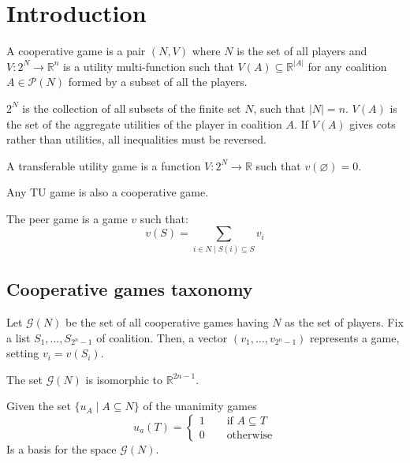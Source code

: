 \section{Introduction}

\begin{definition}
    A cooperative game is a pair $(N,V)$ where $N$ is the set of all players and $V:2^N\rightarrow\mathbb{R}^n$ is a utility multi-function such that $V(A)\subseteq\mathbb{R}^{\left\lvert A\right\rvert}$ for any coalition $A\in\mathcal{P}(N)$ formed by a subset of all the players.
\end{definition}
\noindent $2^N$ is the collection of all subsets of the finite set $N$, such that $\left\lvert N\right\rvert=n$. 
$V(A)$ is the set of the aggregate utilities of the player in coalition $A$. 
If $V(A)$ gives cots rather than utilities, all inequalities must be reversed. 

\begin{definition}
    A transferable utility game is a function $V:2^N\rightarrow\mathbb{R}$ such that $v(\varnothing)=0$.
\end{definition}
\noindent Any TU game is also a cooperative game. 

\begin{definition}
    The peer game is a game $v$ such that: 
    \[v(S)=\sum_{i\in N\mid S(i)\subseteq S}v_i\]
\end{definition}

\subsection{Cooperative games taxonomy}
Let $\mathcal{G}(N)$ be the set of all cooperative games having $N$ as the set of players. 
Fix a list $S_1,\dots,S_{2^n-1}$ of coalition. 
Then, a vector $(v_1,\dots,v_{2^n-1})$ represents a game, setting $v_i=v(S_i)$. 
\begin{proposition}
    The set $\mathcal{G}(N)$ is isomorphic to $\mathbb{R}^{2n-1}$. 
\end{proposition}
\begin{proposition}
    Given the set $\{u_A\mid A\subseteq N\}$ of the unanimity games 
    \[u_a(T)=\begin{cases}
        1 \qquad\text{if }A\subseteq T \\
        0 \qquad \text{otherwise}
    \end{cases}\]
    Is a basis for the space $\mathcal{G}(N)$. 
\end{proposition}

